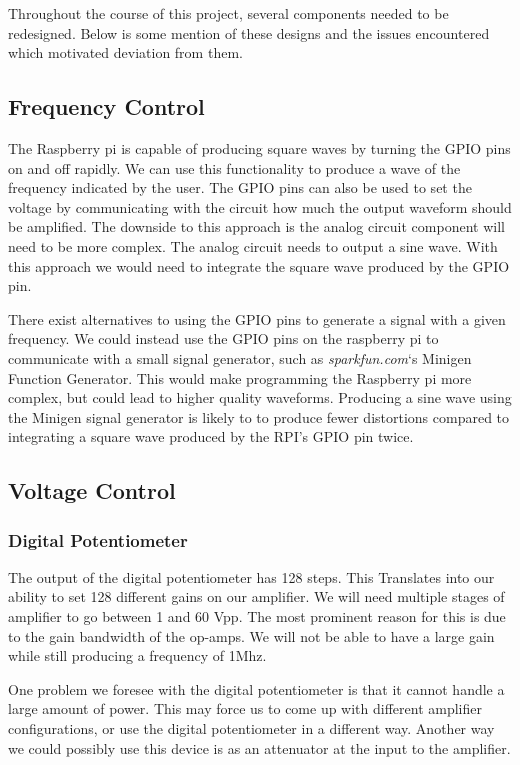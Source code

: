 \documentclass{article}	%
\begin{document}
Throughout the course of this project,
several components needed to be redesigned.
Below is some mention of these designs and
the issues encountered which motivated deviation from them.

\subsection{Frequency Control}
The Raspberry pi is capable of producing square waves by turning the GPIO pins on and off rapidly. We can use this functionality to produce a wave of the frequency indicated by the user. The GPIO pins can also be used to set the voltage by communicating with the circuit how much the output waveform should be amplified. The downside to this approach is the analog circuit component will need to be more complex. The analog circuit needs to output a sine wave. With this approach we would need to integrate the square wave produced by the GPIO pin.

There exist alternatives to using the GPIO pins to generate a signal with a given frequency. We could instead use the GPIO pins on the raspberry pi to communicate with a small signal generator, such as \textit{sparkfun.com}‘s Minigen Function Generator. This would make programming the Raspberry pi more complex, but could lead to higher quality waveforms. Producing a sine wave using the Minigen signal generator is likely to to produce fewer distortions compared to integrating a square wave produced by the RPI’s GPIO pin twice. 

\subsection{Voltage Control}
\subsubsection{Digital Potentiometer}
The output of the digital potentiometer has 128 steps. This Translates into our ability to set 128 different gains on our amplifier. We will need multiple stages of amplifier to go between 1 and 60 Vpp. The most prominent reason for this is due to the gain bandwidth of the op-amps. We will not be able to have a large gain while still producing a frequency of 1Mhz.

One problem we foresee with the digital potentiometer is that it cannot handle a large amount of power. This may force us to come up with different amplifier configurations, or use the digital potentiometer in a different way. Another way we could possibly use this device is as an attenuator at the input to the amplifier.
\end{document}
